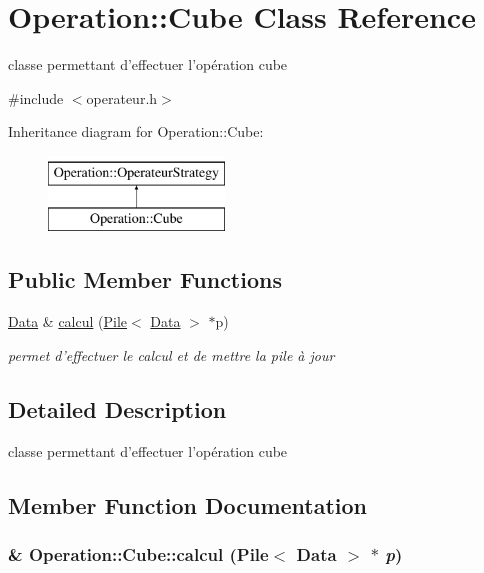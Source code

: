 \hypertarget{classOperation_1_1Cube}{
\section{Operation::Cube Class Reference}
\label{classOperation_1_1Cube}
}


classe permettant d'effectuer l'opération cube  




{\ttfamily \#include $<$operateur.h$>$}

Inheritance diagram for Operation::Cube:\begin{figure}[H]
\begin{center}
\leavevmode
\includegraphics[height=2cm]{classOperation_1_1Cube}
\end{center}
\end{figure}
\subsection*{Public Member Functions}
\begin{DoxyCompactItemize}
\item 
\hyperlink{classNombre_1_1Data}{Data} \& \hyperlink{classOperation_1_1Cube_afe72197cd1178112ac3fcf6514c18042}{calcul} (\hyperlink{classPile}{Pile}$<$ \hyperlink{classNombre_1_1Data}{Data} $>$ $\ast$p)
\begin{DoxyCompactList}\small\item\em permet d'effectuer le calcul et de mettre la pile à jour \item\end{DoxyCompactList}\end{DoxyCompactItemize}


\subsection{Detailed Description}
classe permettant d'effectuer l'opération cube 

\subsection{Member Function Documentation}
\hypertarget{classOperation_1_1Cube_afe72197cd1178112ac3fcf6514c18042}{
\subsubsection[{calcul}]{\& Operation::Cube::calcul ({\bf Pile}$<$ {\bf Data} $>$ $\ast$ {\em p})}}
\label{classOperation_1_1Cube_afe72197cd1178112ac3fcf6514c18042}


